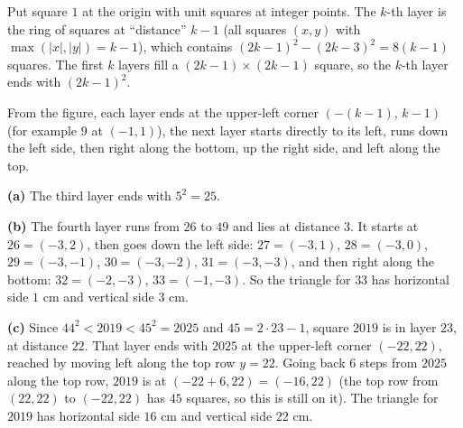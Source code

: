Put square $1$ at the origin with unit squares at integer points. The $k$-th layer is the ring of squares at ``distance'' $k-1$ (all squares $(x,y)$ with $\max(|x|,|y|)=k-1$), which contains $(2k-1)^2-(2k-3)^2=8(k-1)$ squares. The first $k$ layers fill a $(2k-1)\times(2k-1)$ square, so the $k$-th layer ends with $(2k-1)^2$.

From the figure, each layer ends at the upper-left corner $(-(k-1),\,k-1)$ (for example $9$ at $(-1,1)$), the next layer starts directly to its left, runs down the left side, then right along the bottom, up the right side, and left along the top.

\textbf{(a)} The third layer ends with $5^2=\boxed{25}$.

\textbf{(b)} The fourth layer runs from $26$ to $49$ and lies at distance $3$. It starts at $26=(-3,2)$, then goes down the left side: $27=(-3,1)$, $28=(-3,0)$, $29=(-3,-1)$, $30=(-3,-2)$, $31=(-3,-3)$, and then right along the bottom: $32=(-2,-3)$, $33=(-1,-3)$. So the triangle for $33$ has horizontal side $\boxed{1\text{ cm}}$ and vertical side $\boxed{3\text{ cm}}$.

\textbf{(c)} Since $44^2<2019<45^2=2025$ and $45=2\cdot23-1$, square $2019$ is in layer $23$, at distance $22$. That layer ends with $2025$ at the upper-left corner $(-22,22)$, reached by moving left along the top row $y=22$. Going back $6$ steps from $2025$ along the top row, $2019$ is at $(-22+6,22)=(-16,22)$ (the top row from $(22,22)$ to $(-22,22)$ has $45$ squares, so this is still on it). The triangle for $2019$ has horizontal side $\boxed{16\text{ cm}}$ and vertical side $\boxed{22\text{ cm}}$.
